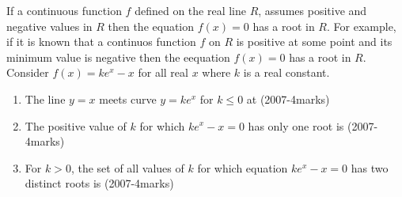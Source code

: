 \documentclass[journal,,12pt,twocolumn]{IEEEtran}
\theoremstyle{remark}
\begin{document}
 If a continuous function $f$ defined on the real line $R$, assumes positive and negative values in $R$ then the equation $f(x)=0$ has a root in $R$. For example, if it is known that a continuos function $f$ on $R$ is positive at some point and its minimum value is negative then the eequation $f(x)=0$ has a root in $R$.\\
 Consider $f(x)=ke^x-x$ for all real $x$ where $k$ is a real constant.
 \begin{enumerate}
 \item The line $y=x$ meets curve $y=ke^x$ for $k \le 0$ at
 \hfill {(2007-4marks)}\\
    \begin{enumerate}
\end{enumerate}

  



\item  The positive value of $k$ for which $ke^x-x=0$ has only one root is
\hfill {(2007-4marks)}\\
\begin{enumerate}
\end{enumerate}




\item For $k>0$, the set of all values of $k$ for which equation $ke^x-x=0$ has two distinct roots is 
\hfill {(2007-4marks)}\\
\begin{enumerate}
\end{enumerate}



\end{enumerate}
\end{document}
